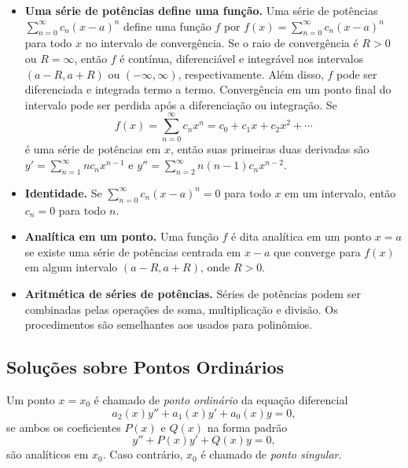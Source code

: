 \documentclass{article}
\begin{document}
\begin{rem}
\begin{itemize}
        \item \textbf{Uma série de potências define uma função.} Uma série de potências \(\sum_{n=0}^{\infty} c_n (x-a)^n\) define uma função \(f\) por \( f(x) = \sum_{n=0}^{\infty} c_n (x-a)^n\) para todo \(x\) no intervalo de convergência. Se o raio de convergência é \(R>0\) ou \(R = \infty\), então \(f\) é contínua, diferenciável e integrável nos intervalos \((a-R, a+R)\) ou \((-\infty, \infty)\), respectivamente. Além disso, \(f\) pode ser diferenciada e integrada termo a termo. Convergência em um ponto final do intervalo pode ser perdida após a diferenciação ou integração. Se 
        \[ f(x) = \sum_{n=0}^{\infty} c_n x^n = c_0 + c_1 x + c_2 x^2 + \cdots \]
        \noindent é uma série de potências em \(x\), então suas primeiras duas derivadas são \( y' = \sum_{n=1}^{\infty} n c_n x^{n-1}\) e \( y'' = \sum_{n=2}^{\infty} n(n-1)c_n x^{n-2}\).
        \item \textbf{Identidade.} Se \(\sum_{n=0}^{\infty} c_n (x-a)^n = 0\) para todo \(x\) em um intervalo, então \(c_n = 0\) para todo \(n\).
        \item \textbf{Analítica em um ponto.} Uma função \(f\) é dita analítica em um ponto \(x=a\) se existe uma série de potências centrada em \(x-a\) que converge para \(f(x)\) em algum intervalo \((a-R, a+R)\), onde \(R>0\).
        \item \textbf{Aritmética de séries de potências.} Séries de potências podem ser combinadas pelas operações de soma, multiplicação e divisão. Os procedimentos são semelhantes aos usados para polinômios.
    \end{itemize}
\end{rem}

\subsection{Soluções sobre Pontos Ordinários}

\begin{defn}
    Um ponto \(x=x_0\) é chamado de \emph{ponto ordinário} da equação diferencial
    \begin{equation}\label{eq:edo1}
        a_2(x)y'' + a_1(x)y' + a_0(x)y = 0,
    \end{equation}
    \noindent se ambos os coeficientes \(P(x)\) e \(Q(x)\) na forma padrão
    \begin{equation}\label{eq:edo2}
        y'' + P(x)y' + Q(x)y = 0,
    \end{equation}
\noindent são analíticos em \(x_0\). Caso contrário, \(x_0\) é chamado de \emph{ponto singular}.
\end{defn}
\end{document}
